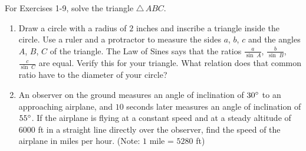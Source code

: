 \startexercises\label{sec2dot1}
\vspace{4mm}
{\small
\par\noindent For Exercises 1-9, solve the triangle $\triangle\,ABC$.
\begin{enumerate}[\bfseries 1.]
 \item Draw a circle with a radius of $2$ inches and inscribe a triangle inside the
  circle. Use a ruler and a protractor to
  measure the sides $a$, $b$, $c$ and the angles $A$, $B$, $C$ of the
  triangle. The Law of Sines says that the ratios $\frac{a}{\sin\;A}$, $\frac{b}{\sin\;B}$,
  $\frac{c}{\sin\;C}$ are equal. Verify this for your triangle. What relation does that common
  ratio have to the diameter of your circle?
 \item An observer on the ground measures an angle of inclination of $30^\circ$ to an approaching
  airplane, and $10$ seconds later measures an angle of inclination of $55^\circ$. If the airplane
  is flying at a constant speed and at a steady altitude of $6000$ ft in a straight line directly
  over the observer, find the speed of the airplane in miles per hour. (Note: $1$ mile =
  $5280$ ft)\vspace{-2mm}


\end{enumerate}}
